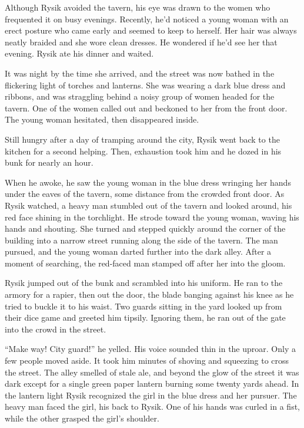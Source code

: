 \documentclass[10pt,b5paper]{article}
\begin{document}
Although Rysik avoided the tavern, his eye was drawn to the women
who frequented it on busy evenings. Recently, he'd noticed a young
woman with an erect posture who came early and seemed to keep to
herself. Her hair was always neatly braided and she wore clean
dresses. He wondered if he'd see her that evening. Rysik ate his
dinner and waited.

It was night by the time she arrived, and the street was now bathed
in the flickering light of torches and lanterns. She was wearing
a dark blue dress and ribbons, and was straggling behind a noisy
group of women headed for the tavern. One of the women called out
and beckoned to her from the front door. The young woman hesitated,
then disappeared inside.

Still hungry after a day of tramping around the city, Rysik went
back to the kitchen for a second helping. Then, exhaustion took
him and he dozed in his bunk for nearly an hour.

When he awoke, he saw the young woman in the blue dress wringing her
hands under the eaves of the tavern, some distance from the crowded
front door. As Rysik watched, a heavy man stumbled out of the tavern
and looked around, his red face shining in the torchlight. He strode
toward the young woman, waving his hands and shouting. She turned
and stepped quickly around the corner of the building into a narrow
street running along the side of the tavern. The man pursued, and
the young woman darted further into the dark alley. After a moment
of searching, the red-faced man stamped off after her into the gloom.

Rysik jumped out of the bunk and scrambled into his uniform. He ran
to the armory for a rapier, then out the door, the blade banging
against his knee as he tried to buckle it to his waist. Two guards
sitting in the yard looked up from their dice game and greeted him
tipsily. Ignoring them, he ran out of the gate into the crowd in
the street.

``Make way! City guard!'' he yelled. His voice sounded thin in the
uproar. Only a few people moved aside. It took him minutes of
shoving and squeezing to cross the street. The alley smelled of
stale ale, and beyond the glow of the street it was dark except for
a single green paper lantern burning some twenty yards ahead. In
the lantern light Rysik recognized the girl in the blue dress and
her pursuer. The heavy man faced the girl, his back to Rysik. One
of his hands was curled in a fist, while the other grasped the
girl's shoulder.
\end{document}

